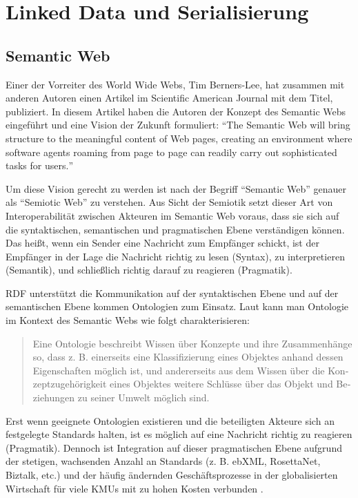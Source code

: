 \section{Linked Data und Serialisierung}
\label{sec:linked-data-serialisierung}

\subsection{Semantic Web}
\label{sec:semantic-web}

Einer der Vorreiter des World Wide Webs, Tim Berners-Lee, hat zusammen mit anderen Autoren \citeyear{berners2001semantic} einen Artikel im Scientific American Journal mit dem Titel,  publiziert. In diesem Artikel haben die Autoren der Konzept des Semantic Webs eingeführt und eine Vision der Zukunft formuliert: \hyphenquote{german}{The Semantic Web will bring structure to the meaningful content of Web pages, creating an environment where software agents roaming from page to page can readily carry out sophisticated tasks for users.}

Um diese Vision gerecht zu werden ist nach \citeauthor{blumauer2006semantic} der Begriff \hyphenquote{german}{Semantic Web} genauer als \hyphenquote{german}{Semiotic Web} zu verstehen. Aus Sicht der Semiotik setzt dieser Art von Interoperabilität zwischen Akteuren im Semantic Web voraus, dass sie sich auf die syntaktischen, semantischen und pragmatischen Ebene verständigen können. Das heißt, wenn ein Sender eine Nachricht zum Empfänger schickt, ist der Empfänger in der Lage die Nachricht richtig zu lesen (Syntax), zu interpretieren (Semantik), und schließlich richtig darauf zu reagieren (Pragmatik)\parencite[vgl.]{voigtmann2002enterprise}. 

RDF unterstützt die Kommunikation auf der syntaktischen Ebene und auf der semantischen Ebene kommen Ontologien zum Einsatz. Laut \citeauthor[S.~488]{may2006semantic} kann man Ontologie im Kontext des Semantic Webs wie folgt charakterisieren: \hyphenblockquote{german}{Eine Ontologie beschreibt Wissen über Konzepte und ihre Zusammenhänge so, dass z. B. einerseits eine Klassifizierung eines Objektes anhand dessen Eigenschaften möglich ist, und andererseits aus dem Wissen über die Konzeptzugehörigkeit eines Objektes weitere Schlüsse über das Objekt und Beziehungen zu seiner Umwelt möglich sind.} Erst wenn geeignete Ontologien existieren und die beteiligten Akteure sich an festgelegte Standards halten, ist es möglich auf eine Nachricht richtig zu reagieren (Pragmatik). Dennoch ist Integration auf dieser pragmatischen Ebene aufgrund der stetigen, wachsenden Anzahl an Standards (z. B. ebXML, RosettaNet, Biztalk, etc.) und der häufig ändernden Geschäftsprozesse in der globalisierten Wirtschaft für viele KMUs mit zu hohen Kosten verbunden \parencite[vgl.][S.~4ff]{rebstock2008ontologies}.

